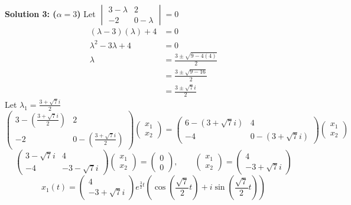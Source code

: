 \documentclass[12pt]{article}
\begin{document}
\noindent \textbf{Solution 3: ($\alpha = 3$) } Let 
$		
\begin{vmatrix}
	3 - \lambda  & 2 \\
	-2 & 0 - \lambda
\end{vmatrix} = 0
$ 
\begin{align*}
	(\lambda - 3)(\lambda) + 4 &= 0 \\
	\lambda^2 - 3\lambda + 4 &= 0 \\
	\lambda &= \frac{3 \pm \sqrt{9 - 4(4)}}{2} \\
	&= \frac{3 \pm \sqrt{9 - 16}}{2} \\
	&= \frac{3 \pm \sqrt{7}i}{2} 
\end{align*}
Let $\lambda_1 = \frac{3 + \sqrt{7}i}{2}$
$$
\begin{pmatrix}
	3 - (\frac{3 + \sqrt{7}i}{2}) & 2 \\
	-2 & 0 - (\frac{3 + \sqrt{7}i}{2})
\end{pmatrix}
\begin{pmatrix}
	x_1 \\
	x_2
\end{pmatrix} = 
\begin{pmatrix}
	6 - (3 + \sqrt{7}i) & 4 \\
	-4 & 0 - (3 + \sqrt{7}i)
\end{pmatrix}
\begin{pmatrix}
	x_1 \\
	x_2
\end{pmatrix}
$$
$$
\begin{pmatrix}
	3 - \sqrt{7}i & 4 \\
	-4 & -3 - \sqrt{7}i
\end{pmatrix}
\begin{pmatrix}
	x_1 \\
	x_2
\end{pmatrix} = 
\begin{pmatrix}
	0 \\
	0
\end{pmatrix}
, \qquad 
\begin{pmatrix}
	x_1 \\
	x_2
\end{pmatrix} = 
\begin{pmatrix}
	4 \\
	-3 + \sqrt{7}i
\end{pmatrix}
$$
$$
x_1(t) = \begin{pmatrix}
	4 \\
	-3 + \sqrt{7}i
\end{pmatrix} 
e^{\frac{3}{2}t}\left( \cos\left(\frac{\sqrt{7}}{2}t\right) + i\sin\left(\frac{\sqrt{7}}{2}t\right) \right)
$$ \\
\end{document}
